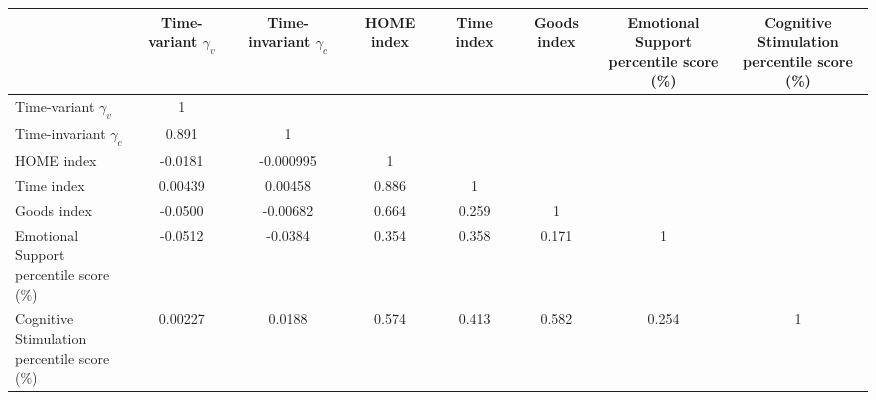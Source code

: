 {
\begin{tabular}{l*{7}{c}}
\hline\hline

          &\thead{Time-variant \\$\gamma_v$}         &\thead{Time-invariant \\$\gamma_c$}         &  \textbf{HOME index}         & \textbf{Time index}         &\textbf{Goods index}         &\thead{Emotional Support\\ percentile score (\%)}        &\thead{Cognitive Stimulation\\ percentile score (\%)}        \\
\hline
Time-variant $\gamma_v$&        1         &                  &                  &                  &                  &                  &                  \\
Time-invariant $\gamma_c$&    0.891\sym{***}&        1         &                  &                  &                  &                  &                  \\
HOME index   &  -0.0181         &-0.000995         &        1         &                  &                  &                  &                  \\
Time index  &  0.00439         &  0.00458         &    0.886\sym{***}&        1         &                  &                  &                  \\
Goods index &  -0.0500\sym{***}& -0.00682         &    0.664\sym{***}&    0.259\sym{***}&        1         &                  &                  \\
\makecell{Emotional Support\\ percentile score (\%)} &  -0.0512\sym{***}&  -0.0384\sym{**} &    0.354\sym{***}&    0.358\sym{***}&    0.171\sym{***}&        1         &                  \\
\makecell{Cognitive Stimulation\\ percentile score (\%)}&  0.00227         &   0.0188         &    0.574\sym{***}&    0.413\sym{***}&    0.582\sym{***}&    0.254\sym{***}&        1         \\
\hline\hline
\end{tabular}
}
